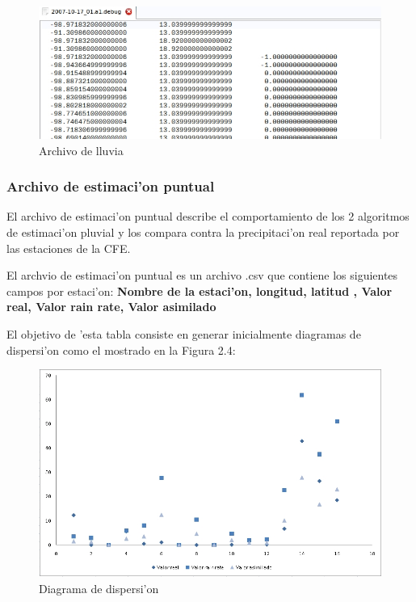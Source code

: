 \begin{figure}[h!]
 \centering
 \includegraphics[width=160mm,bb=0 0 677 262]{./imagenes/archivodebug.jpg}
 \caption{Archivo de lluvia}
\end{figure}

\subsubsection*{Archivo de estimaci'on puntual}
El archivo de estimaci'on puntual describe el comportamiento de los 2 algoritmos de estimaci'on pluvial y los compara
contra la precipitaci'on real reportada por las estaciones de la CFE.

El archvio de estimaci'on puntual es un archivo .csv que contiene los siguientes campos por estaci'on: 
\textbf{Nombre de la estaci'on, longitud, latitud , Valor real, Valor rain rate, Valor asimilado}

El objetivo de 'esta tabla consiste en generar inicialmente diagramas de dispersi'on como el mostrado en la Figura 2.4:

\begin{figure}[h!]
 \centering
 \includegraphics[width=170mm,bb=0 0 837 507]{./imagenes/archivoErrorAnalysis.png}
 \caption{Diagrama de dispersi'on}
\end{figure}


